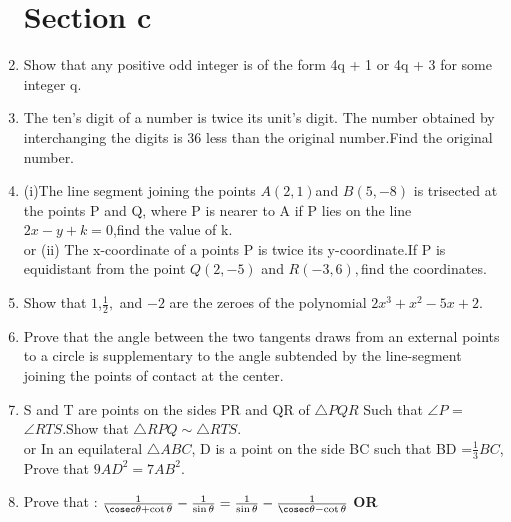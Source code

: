 \documentclass[journal,12pt,twocolumn]{IEEEtran}
\renewcommand\thesection{\arabic{section}}
\begin{document}
\begin{enumerate}[label=\thesection.\arabic*.,ref=\thesection.\theenumi]
\section{Section c}
\item Show that any positive odd integer is of the form 4q + 1 or 4q + 3 for some integer q.\\
\newline
\item The ten's digit of a number is twice its unit's digit. The number obtained by interchanging the digits is 36 less than the original number.Find the original number.\\
\newline 
\item (i)The line segment joining the points $A(2,1)$and $B(5,-8)$ is trisected at the points P and Q, where P is nearer to A if P lies on the line $2x-y+k=0$,find the value of k.\\or
\newline (ii) The x-coordinate of a points P is twice its y-coordinate.If P is equidistant from the point $Q(2,-5)$ and $R(-3,6),$find the coordinates.\\
\newline
\item Show that $1$,$\frac{1}{2},$ and $-2$ are the zeroes of the polynomial $2x^3+x^2-5x+2.$\\
\newline
\item Prove that the angle between the two tangents draws from an external points to a circle is supplementary to the angle subtended by the line-segment joining the points of contact at the center.\\
\newline
\item S and T are points on the sides PR and QR of $\triangle PQR $ Such that  $\angle P $ = $\angle RTS$.Show that $\triangle RPQ \sim \triangle RTS$.\\ or
\newline
In an equilateral $\triangle ABC$, D is a point on the side BC such that BD =$\frac{1}{3}BC$, Prove that $9AD^2 =7AB^2.$\\
\newline
\item Prove that : $\frac{1}{\cosec\theta + \cot\theta}-\frac{1}{\sin\theta}=\frac{1}{\sin\theta}-\frac{1}{\cosec\theta-\cot\theta}$
{\centering 
\newline \textbf{OR}}
\newline

\end{enumerate}
\end{document}
